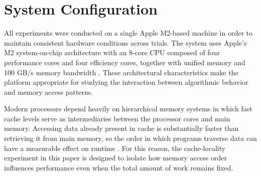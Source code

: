 \section{System Configuration}

All experiments were conducted on a single Apple M2-based machine in order to maintain consistent hardware conditions across trials. The system uses Apple's M2 system-on-chip architecture with an 8-core CPU composed of four performance cores and four efficiency cores, together with unified memory and 100 GB/s memory bandwidth \cite{apple_m2_specs}. These architectural characteristics make the platform appropriate for studying the interaction between algorithmic behavior and memory access patterns.

Modern processors depend heavily on hierarchical memory systems in which fast cache levels serve as intermediaries between the processor cores and main memory. Accessing data already present in cache is substantially faster than retrieving it from main memory, so the order in which programs traverse data can have a measurable effect on runtime \cite{lam1991, mckee2004}. For this reason, the cache-locality experiment in this paper is designed to isolate how memory access order influences performance even when the total amount of work remains fixed.
